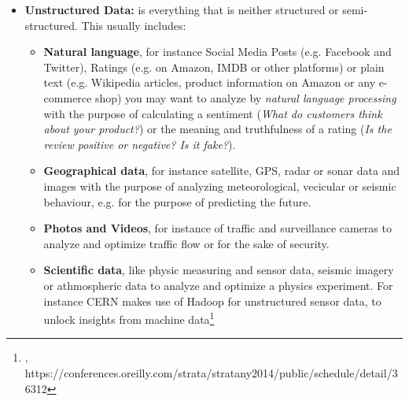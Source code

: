 \begin{itemize}
\begin{itemize}
	\end{itemize}
	\item \textbf{Unstructured Data:} is everything that is neither structured or semi-structured. This usually includes:
	\begin{itemize}
		\item \textbf{Natural language}, for instance Social Media Posts (e.g. Facebook and Twitter), Ratings (e.g. on Amazon, IMDB or other platforms) or plain text (e.g. Wikipedia articles, product information on Amazon or any e-commerce shop) you may want to analyze by \textit{natural language processing} with the purpose of calculating a sentiment (\textit{What do customers think about your product?}) or the meaning and truthfulness of a rating (\textit{Is the review positive or negative? Is it fake?}). 
		\item \textbf{Geographical data}, for instance satellite, GPS, radar or sonar data and images with the purpose of analyzing meteorological, vecicular or seismic behaviour, e.g. for the purpose of predicting the future.
		\item \textbf{Photos and Videos}, for instance of traffic and surveillance cameras to analyze and optimize traffic flow or for the sake of security.
		\item \textbf{Scientific data}, like physic measuring and sensor data, seismic imagery or athmospheric data to analyze and optimize a physics experiment. For instance CERN makes use of Hadoop for unstructured sensor data, to unlock insights from machine data\footnote{\cite{CERNH}, https://conferences.oreilly.com/strata/stratany2014/public/schedule/detail/36312}
		\end{itemize}
\end{itemize}

